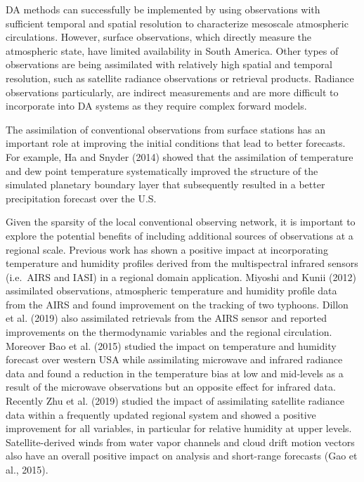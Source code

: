\documentclass[final,5p,times,twocolumn,authoryear]{elsarticle} %
\begin{document}
DA methods can successfully be implemented by using observations with sufficient temporal and spatial resolution to characterize mesoscale atmospheric circulations.
However, surface observations, which directly measure the atmospheric state, have limited availability in South America.
Other types of observations are being assimilated with relatively high spatial and temporal resolution, such as satellite radiance observations or retrieval products.
Radiance observations particularly, are indirect measurements and are more difficult to incorporate into DA systems as they require complex forward models.

The assimilation of conventional observations from surface stations has an important role at improving the initial conditions that lead to better forecasts.
For example, Ha and Snyder (2014) showed that the assimilation of temperature and dew point temperature systematically improved the structure of the simulated planetary boundary layer that subsequently resulted in a better precipitation forecast over the U.S.

Given the sparsity of the local conventional observing network, it is important to explore the potential benefits of including additional sources of observations at a regional scale.
Previous work has shown a positive impact at incorporating temperature and humidity profiles derived from the multispectral infrared sensors (i.e.~AIRS and IASI) in a regional domain application.
Miyoshi and Kunii (2012) assimilated observations, atmospheric temperature and humidity profile data from the AIRS and found improvement on the tracking of two typhoons.
Dillon et al. (2019) also assimilated retrievals from the AIRS sensor and reported improvements on the thermodynamic variables and the regional circulation.
Moreover Bao et al. (2015) studied the impact on temperature and humidity forecast over western USA while assimilating microwave and infrared radiance data and found a reduction in the temperature bias at low and mid-levels as a result of the microwave observations but an opposite effect for infrared data. Recently Zhu et al. (2019) studied the impact of assimilating satellite radiance data within a frequently updated regional system and showed a positive improvement for all variables, in particular for relative humidity at upper levels.
Satellite-derived winds from water vapor channels and cloud drift motion vectors also have an overall positive impact on analysis and short-range forecasts (Gao et al., 2015).
\end{document}

